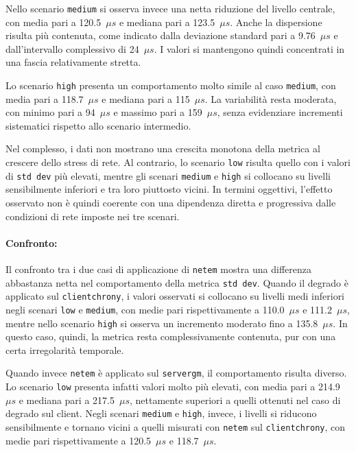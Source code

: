 Nello scenario \texttt{medium} si osserva invece una netta riduzione del livello
centrale, con media pari a 120.5~$\mu s$ e mediana pari a 123.5~$\mu s$. Anche
la dispersione risulta più contenuta, come indicato dalla deviazione standard pari
a 9.76~$\mu s$ e dall’intervallo complessivo di 24~$\mu s$. I valori si
mantengono quindi concentrati in una fascia relativamente stretta.

Lo scenario \texttt{high} presenta un comportamento molto simile al caso \texttt{medium},
con media pari a 118.7~$\mu s$ e mediana pari a 115~$\mu s$. La variabilità
resta moderata, con minimo pari a 94~$\mu s$ e massimo pari a 159~$\mu s$, senza
evidenziare incrementi sistematici rispetto allo scenario intermedio.

Nel complesso, i dati non mostrano una crescita monotona della metrica al crescere
dello stress di rete. Al contrario, lo scenario \texttt{low} risulta quello con
i valori di \texttt{std dev} più elevati, mentre gli scenari \texttt{medium} e \texttt{high}
si collocano su livelli sensibilmente inferiori e tra loro piuttosto vicini. In termini
oggettivi, l’effetto osservato non è quindi coerente con una dipendenza diretta
e progressiva dalle condizioni di rete imposte nei tre scenari.

\paragraph*{Confronto:}
Il confronto tra i due casi di applicazione di \texttt{netem} mostra una
differenza abbastanza netta nel comportamento della metrica \texttt{std dev}.
Quando il degrado è applicato sul \texttt{clientchrony}, i valori osservati si
collocano su livelli medi inferiori negli scenari \texttt{low} e \texttt{medium},
con medie pari rispettivamente a 110.0~$\mu s$ e 111.2~$\mu s$, mentre nello
scenario \texttt{high} si osserva un incremento moderato fino a 135.8~$\mu s$.
In questo caso, quindi, la metrica resta complessivamente contenuta, pur con una certa
irregolarità temporale.

Quando invece \texttt{netem} è applicato sul \texttt{servergm}, il comportamento
risulta diverso. Lo scenario \texttt{low} presenta infatti valori molto più
elevati, con media pari a 214.9~$\mu s$ e mediana pari a 217.5~$\mu s$,
nettamente superiori a quelli ottenuti nel caso di degrado sul client. Negli scenari
\texttt{medium} e \texttt{high}, invece, i livelli si riducono sensibilmente e tornano
vicini a quelli misurati con \texttt{netem} sul \texttt{clientchrony}, con medie
pari rispettivamente a 120.5~$\mu s$ e 118.7~$\mu s$.


